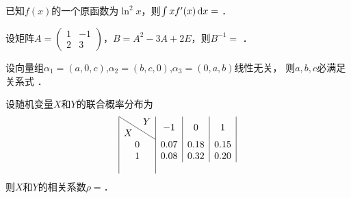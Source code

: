 \documentclass[plain,noanswer,medmath]{../../template/jnuexam}
\begin{document}








\begin{problem}
已知$f(x)$的一个原函数为$\ln^2 x$，则$\int xf'(x)\mathop{}\!\mathrm{d} x =$ \fillin{}．
\end{problem}


\begin{problem}
设矩阵$A = \begin{pmatrix}
  1 & -1 \\
  2 & 3
\end{pmatrix}$，$B = A^2 - 3A + 2E$，则$B^{-1} =$ \fillin{}．
\end{problem}


\begin{problem}
设向量组$\alpha_1 = (a,0,c)$,$\alpha_2 = (b,c,0)$,$\alpha_3 = (0,a,b)$线性无关，
则$a,b,c$必满足关系式 \fillin{}．
\end{problem}

\begin{problem}
设随机变量$X$和$Y$的联合概率分布为
$$\begin{array}{|c|c|c|c|}
\hline
  \diagboxtwo{X}{Y} & -1 & 0 & 1 \\
\hline
  0 & 0.07 & 0.18 & 0.15 \\
\hline
  1 & 0.08 & 0.32 & 0.20 \\
\hline
\end{array}$$
则$X$和$Y$的相关系数$\rho=$．
\end{problem}






\end{document}

